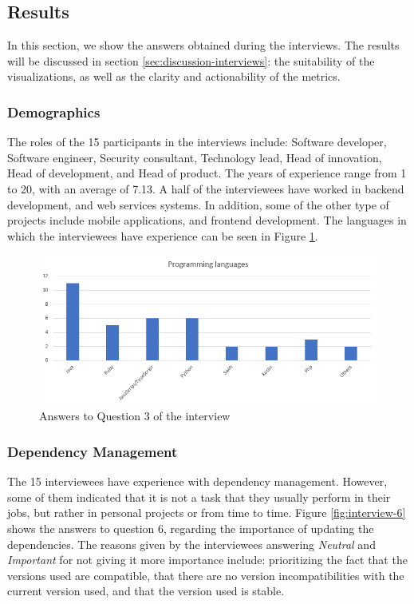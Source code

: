 \subsection{Results}
In this section, we show the answers obtained during the interviews. The results will be discussed in section \ref{sec:discussion-interviews}: the suitability of the visualizations, as well as the clarity and actionability of the metrics.

\subsubsection{Demographics}

The roles of the 15 participants in the interviews include: Software developer, Software engineer, Security consultant, Technology lead, Head of innovation, Head of development, and Head of product. The years of experience range from 1 to 20, with an average of 7.13. A half of the interviewees have worked in backend development, and web services systems. In addition, some of the other type of projects include mobile applications, and frontend development. The languages in which the interviewees have experience can be seen in Figure \ref{fig:interview-3}.

\begin{figure}[ht]
\begin{center}
\includegraphics[width=\textwidth]{figures/interview/Question3.png}
\caption{Answers to Question 3 of the interview}
\label{fig:interview-3}
\end{center}
\end{figure}

\subsubsection{Dependency Management}

The 15 interviewees have experience with dependency management. However, some of them indicated that it is not a task that they usually perform in their jobs, but rather in personal projects or from time to time. Figure \ref{fig:interview-6} shows the answers to question 6, regarding the importance of updating the dependencies. The reasons given by the interviewees answering \textit{Neutral} and \textit{Important} for not giving it more importance include: prioritizing the fact that the versions used are compatible, that there are no version incompatibilities with the current version used, and that the version used is stable.

